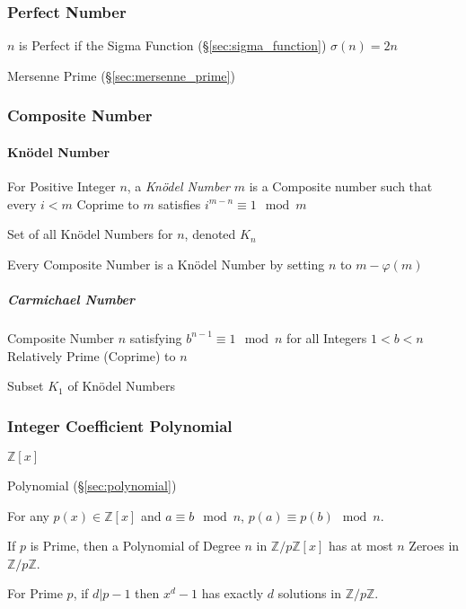 \subsubsection{Perfect Number}\label{sec:perfect_number}

$n$ is Perfect if the Sigma Function (\S\ref{sec:sigma_function})
$\sigma(n) = 2n$

Mersenne Prime (\S\ref{sec:mersenne_prime})



\subsubsection{Composite Number}\label{sec:composite_number}

\paragraph{Kn\"odel Number}\label{sec:knodel_number}\hfill

For Positive Integer $n$, a \emph{Kn\"odel Number} $m$ is a Composite
number such that every $i < m$ Coprime to $m$ satisfies $i^{m-n}
\equiv 1 \mod m$

Set of all Kn\"odel Numbers for $n$, denoted $K_n$

Every Composite Number is a Kn\"odel Number by setting $n$ to $m -
\varphi(m)$



\subparagraph{Carmichael Number}\label{sec:carmichael_number}\hfill

Composite Number $n$ satisfying $b^{n-1} \equiv 1 \mod n$ for all
Integers $1 < b < n$ Relatively Prime (Coprime) to $n$

Subset $K_1$ of Kn\"odel Numbers



\subsubsection{Integer Coefficient Polynomial}
\label{sec:integer_coefficient}

$\mathbb{Z}[x]$

Polynomial (\S\ref{sec:polynomial})

For any $p(x) \in \mathbb{Z}[x]$ and $a \equiv b \mod n$, $p(a) \equiv
p(b) \mod n$.

If $p$ is Prime, then a Polynomial of Degree $n$ in
$\mathbb{Z}/p\mathbb{Z}[x]$ has at most $n$ Zeroes in
$\mathbb{Z}/p\mathbb{Z}$.

For Prime $p$, if $d|p-1$ then $x^d - 1$ has exactly $d$ solutions in
$\mathbb{Z}/p\mathbb{Z}$.



